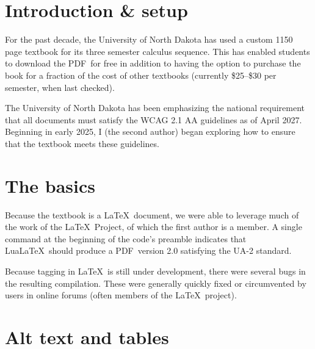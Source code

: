 \documentclass{article}
\makeatletter
\newcommand{\SMC}{%
 \ifdefined\@currsize  %
  \ifx\@currsize\normalsize\small\else
   \ifx\@currsize\small\footnotesize\else
    \ifx\@currsize\footnotesize\scriptsize\else
     \ifx\@currsize\large\normalsize\else
      \ifx\@currsize\Large\large\else
       \ifx\@currsize\LARGE\Large\else
        \ifx\@currsize\scriptsize\tiny\else
         \ifx\@currsize\tiny\tiny\else
          \ifx\@currsize\huge\LARGE\else
           \ifx\@currsize\Huge\huge\else
            \small\SMC@unknown@warning
 \fi\fi\fi\fi\fi\fi\fi\fi\fi\fi\fi
}
\newcommand*{\acro}[1]{{\SMC #1}\@}
\newcommand{\PDF}{\acro{PDF}}
\makeatother
\begin{document}
\maketitle

\begin{abstract}
Modern \LaTeX\ provides a viable roadmap to creating accessible \PDF s.
%
\end{abstract}

\section{Introduction \& setup}

For the past decade, the University of North Dakota has used a custom 1150 page
textbook
for its three semester calculus sequence.
This has enabled students
to download the \PDF\ for free
in addition to having the option to purchase the book
for a fraction of the cost of other textbooks
(currently \$25--\$30 per semester, when last checked).

The University of North Dakota has been emphasizing the national requirement
that all documents must satisfy the \acro{WCAG 2.1 AA} guidelines
as of April 2027.
Beginning in early 2025, I (the second author) began exploring how to ensure that
the textbook meets these guidelines.

\section{The basics}

Because the textbook is a \LaTeX\ document,
we were able to leverage much of the work of the \LaTeX\ Project,
of which the first author is a member.
A single command at the beginning of the code's preamble
indicates that Lua\LaTeX\ should produce
a \PDF\ version 2.0 satisfying the \acro{UA-2} standard.

Because tagging in \LaTeX\ is still under development,
there were several bugs in the resulting compilation.
These were generally quickly fixed or circumvented by users
in online forums (often members of the \LaTeX\ project).

\section{Alt text and tables}
\end{document}

